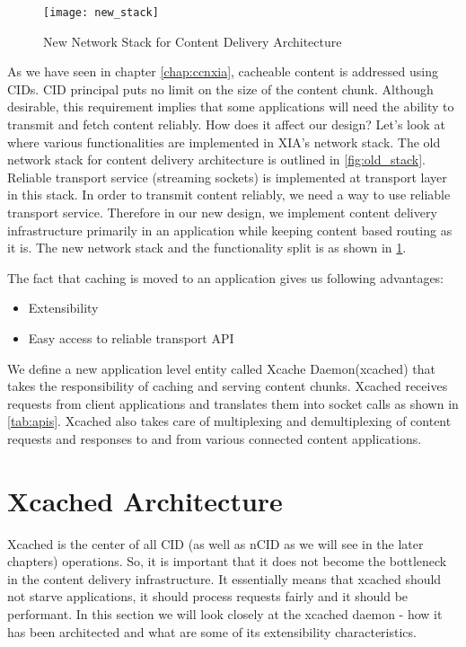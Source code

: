 \begin{figure}
  \begin{center}
    \texttt{[image: new\_stack]}
    \caption{New Network Stack for Content Delivery Architecture}
    \label{fig:new_stack}
  \end{center}
\end{figure}
As we have seen in chapter \ref{chap:ccnxia}, cacheable content is
addressed using CIDs. CID principal puts no limit on the size of the
content chunk. Although desirable, this requirement implies that some
applications will need the ability to transmit and fetch content
reliably. How does it affect our design?  Let’s look at where various
functionalities are implemented in XIA’s network stack. The old
network stack for content delivery architecture is outlined in
\ref{fig:old_stack}. Reliable transport service (streaming sockets) is
implemented at transport layer in this stack. In order to transmit
content reliably, we need a way to use reliable transport
service. Therefore in our new design, we implement content delivery
infrastructure primarily in an application while keeping content based
routing as it is. The new network stack and the functionality split is
as shown in \ref{fig:new_stack}.

The fact that caching is moved to an application gives us following
advantages:
\begin{itemize}
\item{Extensibility}
\item{Easy access to reliable transport API}
\end{itemize}

We define a new application level entity called Xcache Daemon(xcached)
that takes the responsibility of caching and serving content chunks.
Xcached receives requests from client applications and translates them
into socket calls as shown in \ref{tab:apis}. Xcached also takes
care of multiplexing and demultiplexing of content requests and
responses to and from various connected content applications.

\section{Xcached Architecture}

Xcached is the center of all CID (as well as nCID as we will see in
the later chapters) operations. So, it is important that it does not
become the bottleneck in the content delivery infrastructure. It
essentially means that xcached should not starve applications, it
should process requests fairly and it should be performant. In this
section we will look closely at the xcached daemon - how it has been
architected and what are some of its extensibility characteristics.

